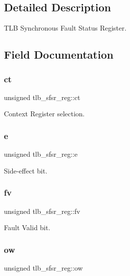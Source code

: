 \subsection{Detailed Description}
T\+LB Synchronous Fault Status Register. 

\subsection{Field Documentation}
\mbox{\label{uniontlb__sfsr__reg_ad844ff82050858e18dd8f55476403a59}} 
\subsubsection{\texorpdfstring{ct}{ct}}
{\footnotesize\ttfamily unsigned tlb\+\_\+sfsr\+\_\+reg\+::ct}

Context Register selection. \mbox{\label{uniontlb__sfsr__reg_a25417c72182f91c7f360589b6e5b9138}} 
\subsubsection{\texorpdfstring{e}{e}}
{\footnotesize\ttfamily unsigned tlb\+\_\+sfsr\+\_\+reg\+::e}

Side-\/effect bit. \mbox{\label{uniontlb__sfsr__reg_a8554ab373e7cd775d0d3a941e885d21a}} 
\subsubsection{\texorpdfstring{fv}{fv}}
{\footnotesize\ttfamily unsigned tlb\+\_\+sfsr\+\_\+reg\+::fv}

Fault Valid bit. \mbox{\label{uniontlb__sfsr__reg_a0376aecfe0bb82af05c2600c2e0adf78}} 
\subsubsection{\texorpdfstring{ow}{ow}}
{\footnotesize\ttfamily unsigned tlb\+\_\+sfsr\+\_\+reg\+::ow}

